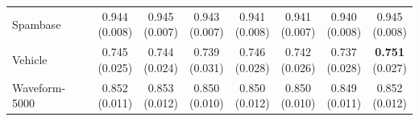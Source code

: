 {\begin{longtable}{lccccccc}
Spambase & \makecell{0.944\\{\tiny (0.008)}} & \makecell{0.945\\{\tiny (0.007)}} & \makecell{0.943\\{\tiny (0.007)}} & \makecell{0.941\\{\tiny (0.008)}} & \makecell{0.941\\{\tiny (0.007)}} & \makecell{0.940\\{\tiny (0.008)}} & \makecell{0.945\\{\tiny (0.008)}} \\
Vehicle & \makecell{0.745\\{\tiny (0.025)}} & \makecell{0.744\\{\tiny (0.024)}} & \makecell{0.739\\{\tiny (0.031)}} & \makecell{0.746\\{\tiny (0.028)}} & \makecell{0.742\\{\tiny (0.026)}} & \makecell{0.737\\{\tiny (0.028)}} & \makecell{\textbf{0.751}\\{\tiny (0.027)}} \\
Waveform-5000 & \makecell{0.852\\{\tiny (0.011)}} & \makecell{0.853\\{\tiny (0.012)}} & \makecell{0.850\\{\tiny (0.010)}} & \makecell{0.850\\{\tiny (0.012)}} & \makecell{0.850\\{\tiny (0.010)}} & \makecell{0.849\\{\tiny (0.011)}} & \makecell{0.852\\{\tiny (0.012)}} \\
\bottomrule
\end{longtable}}

